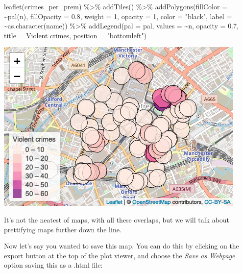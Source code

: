 \documentclass[
  krantz2]{krantz}
\makeatletter
\newenvironment{Shaded}{\begin{snugshade}}{\end{snugshade}}
\newcommand{\AttributeTok}[1]{\textcolor[rgb]{0.61,0.61,0.61}{#1}}
\newcommand{\DecValTok}[1]{\textcolor[rgb]{0.06,0.06,0.06}{#1}}
\newcommand{\FloatTok}[1]{\textcolor[rgb]{0.06,0.06,0.06}{#1}}
\newcommand{\FunctionTok}[1]{\textcolor[rgb]{0,0,0}{#1}}
\newcommand{\NormalTok}[1]{#1}
\newcommand{\SpecialCharTok}[1]{\textcolor[rgb]{0,0,0}{#1}}
\newcommand{\StringTok}[1]{\textcolor[rgb]{0.5,0.5,0.5}{#1}}
\newenvironment{kframe}{%
\medskip{}
\setlength{\fboxsep}{.8em}
 \def\at@end@of@kframe{}%
 \ifinner\ifhmode%
  \def\at@end@of@kframe{\end{minipage}}%
  \begin{minipage}{\columnwidth}%
 \fi\fi%
 \def\FrameCommand##1{\hskip\@totalleftmargin \hskip-\fboxsep
 \colorbox{shadecolor}{##1}\hskip-\fboxsep
     \hskip-\linewidth \hskip-\@totalleftmargin \hskip\columnwidth}%
 \MakeFramed {\advance\hsize-\width
   \@totalleftmargin\z@ \linewidth\hsize
   \@setminipage}}%
 {\par\unskip\endMakeFramed%
 \at@end@of@kframe}
\renewenvironment{Shaded}{\begin{kframe}}{\end{kframe}}
\makeatother
\begin{document}
\begin{Shaded}
\begin{Highlighting}[]
\FunctionTok{leaflet}\NormalTok{(crimes\_per\_prem) }\SpecialCharTok{\%\textgreater{}\%} 
  \FunctionTok{addTiles}\NormalTok{() }\SpecialCharTok{\%\textgreater{}\%} 
  \FunctionTok{addPolygons}\NormalTok{(}\AttributeTok{fillColor =} \SpecialCharTok{\textasciitilde{}}\FunctionTok{pal}\NormalTok{(n), }\AttributeTok{fillOpacity =} \FloatTok{0.8}\NormalTok{,}
              \AttributeTok{weight =} \DecValTok{1}\NormalTok{, }\AttributeTok{opacity =} \DecValTok{1}\NormalTok{, }\AttributeTok{color =} \StringTok{"black"}\NormalTok{,}
              \AttributeTok{label =} \SpecialCharTok{\textasciitilde{}}\FunctionTok{as.character}\NormalTok{(name)) }\SpecialCharTok{\%\textgreater{}\%} 
  \FunctionTok{addLegend}\NormalTok{(}\AttributeTok{pal =}\NormalTok{ pal, }\AttributeTok{values =} \SpecialCharTok{\textasciitilde{}}\NormalTok{n, }\AttributeTok{opacity =} \FloatTok{0.7}\NormalTok{, }
            \AttributeTok{title =} \StringTok{\textquotesingle{}Violent crimes\textquotesingle{}}\NormalTok{, }\AttributeTok{position =} \StringTok{"bottomleft"}\NormalTok{) }
\end{Highlighting}
\end{Shaded}

\includegraphics{crime_mapping_files/figure-latex/unnamed-chunk-52-1.png}

It's not the neatest of maps, with all these overlaps, but we will talk about prettifying maps further down the line.

Now let's say you wanted to save this map. You can do this by clicking on the export button at the top of the plot viewer, and choose the \emph{Save as Webpage} option saving this as a .html file:
\end{document}
